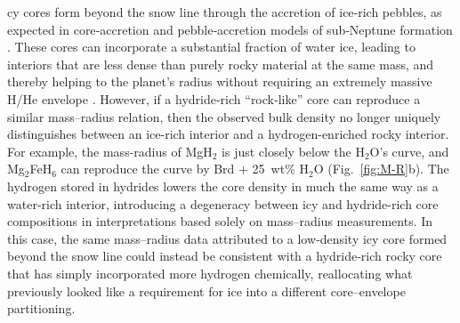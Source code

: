 \documentclass[draft,jgrga,12pt]{agujournal2019}
\begin{document}
cy cores form beyond the snow line through the accretion of ice‑rich pebbles, as expected in core‑accretion and pebble‑accretion models of sub‑Neptune formation \cite{bitsch_dry_2021, bean_nature_2021, burn_radius_2024, venturini_nature_2020}. 
These cores can incorporate a substantial fraction of water ice, leading to interiors that are less dense than purely rocky material at the same mass, and thereby helping to  the planet's radius without requiring an extremely massive H/He envelope \cite{zeng_growth_2019}. 
However, if a hydride‑rich ``rock‑like'' core can reproduce a similar mass–radius relation, then the observed bulk density no longer uniquely distinguishes between an ice-rich interior and a hydrogen-enriched rocky interior. 
For example, the mass-radius of MgH$_2$ is just closely below the H$_2$O's curve, and Mg$_2$FeH$_6$ can reproduce the curve by Brd + 25~wt\% H$_2$O (Fig.~\ref{fig:M-R}b). 
The hydrogen stored in hydrides lowers the core density in much the same way as a water‑rich interior, introducing a degeneracy between icy and hydride-rich core compositions in interpretations based solely on mass--radius measurements.
In this case, the same mass–radius data attributed to a low‑density icy core formed beyond the snow line could instead be consistent with a hydride‑rich rocky core that has simply incorporated more hydrogen chemically, reallocating what previously looked like a requirement for ice into a different core–envelope partitioning.
\end{document}
